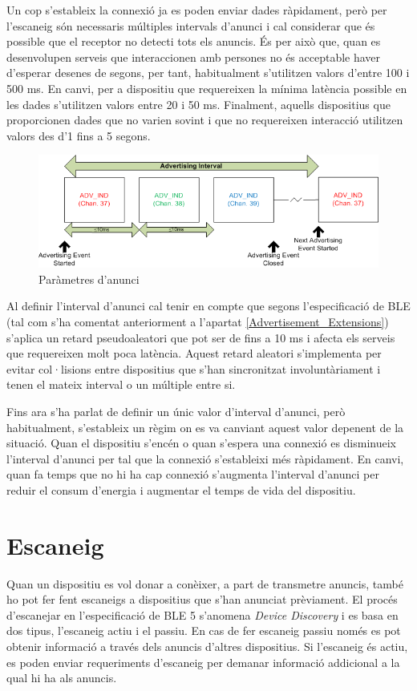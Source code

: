 Un cop s'estableix la connexió ja es poden enviar dades ràpidament, però per l'escaneig són necessaris múltiples intervals d'anunci i cal considerar que és possible que el receptor no detecti tots els anuncis. 
És per això que, quan es desenvolupen serveis que interaccionen amb persones no és acceptable haver d'esperar desenes de segons, per tant, habitualment s'utilitzen valors d'entre 100 i 500 ms.
En canvi, per a dispositiu que requereixen la mínima latència possible en les dades s'utilitzen valors entre 20 i 50 ms.
Finalment, aquells dispositius que proporcionen dades que no varien sovint i que no requereixen interacció utilitzen valors des d'1 fins a 5 segons.

\begin{figure}[h!]
	\begin{center}
		\includegraphics{./images/advertisement_params.png}
		\caption{Paràmetres d'anunci \cite{advertisment_params}}
		\label{fig:advertisment_params}
	\end{center}
\end{figure}

Al definir l'interval d'anunci cal tenir en compte que segons l'especificació de BLE (tal com s'ha comentat anteriorment a l'apartat \ref{Advertisement_Extensions}) s'aplica un retard pseudoaleatori que pot ser de fins a 10 ms i afecta els serveis que requereixen molt poca latència.
Aquest retard aleatori s'implementa per evitar col·lisions entre dispositius que s'han sincronitzat involuntàriament i tenen el mateix interval o un múltiple entre si.

Fins ara s'ha parlat de definir un únic valor d'interval d'anunci, però habitualment, s'estableix un règim on es va canviant aquest valor depenent de la situació.
Quan el dispositiu s'encén o quan s'espera una connexió es disminueix l'interval d'anunci per tal que la connexió s'estableixi més ràpidament.
En canvi, quan fa temps que no hi ha cap connexió s'augmenta l'interval d'anunci per reduir el consum d'energia i augmentar el temps de vida del dispositiu. 


\section{Escaneig}
Quan un dispositiu es vol donar a conèixer, a part de transmetre anuncis, també ho pot fer fent escaneigs a dispositius que s'han anunciat prèviament.
El procés d'escanejar en l'especificació de BLE 5 s'anomena \textit{Device Discovery} i es basa en dos tipus, l'escaneig actiu i el passiu.
En cas de fer escaneig passiu només es pot obtenir informació a través dels anuncis d'altres dispositius.
Si l'escaneig és actiu, es poden enviar requeriments d'escaneig per demanar informació addicional a la qual hi ha als anuncis.


